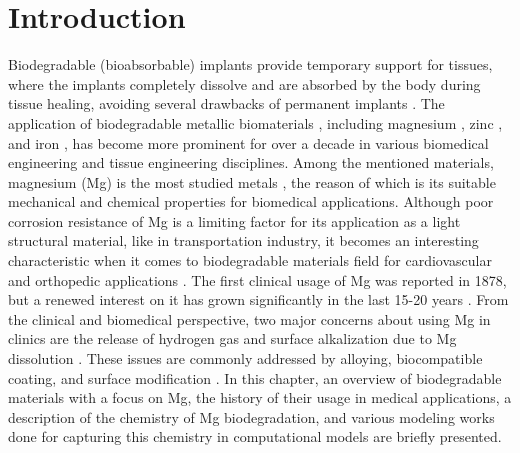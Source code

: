 \chapter{Introduction}\label{ch:introduction}


Biodegradable (bioabsorbable) implants provide temporary support for tissues, where the implants completely dissolve and are absorbed by the body during tissue healing, avoiding several drawbacks of permanent implants \cite{Gao2022}. The application of biodegradable metallic biomaterials \cite{Zheng2014, Liu2019, Han2019}, including magnesium \cite{Zhao2017,Zhen2013,Willumeit-Roemer2019}, zinc \cite{Venezuela2019,Mostaed2018}, and iron \cite{Schinhammer2010}, has become more prominent for over a decade in various biomedical engineering and tissue engineering disciplines. Among the mentioned materials, magnesium (Mg) is the most studied metals \cite{Esmaily2017}, the reason of which is its suitable mechanical and chemical properties for biomedical applications. Although poor corrosion resistance of Mg is a limiting factor for its application as a light structural material, like in transportation industry, it becomes an interesting characteristic when it comes to biodegradable materials field for cardiovascular and orthopedic applications \cite{Heublein2003,Staiger2006,Walker2014}. The first clinical usage of Mg was reported in 1878, but a renewed interest on it has grown significantly in the last 15-20 years \cite{Esmaily2017}. From the clinical and biomedical perspective, two major concerns about using Mg in clinics are the release of hydrogen gas and surface alkalization due to Mg dissolution \cite{Cecchinato2015}. These issues are commonly addressed by alloying, biocompatible coating, and surface modification \cite{Esmaily2017}. In this chapter, an overview of biodegradable materials with a focus on Mg, the history of their usage in medical applications, a description of the chemistry of Mg biodegradation, and various modeling works done for capturing this chemistry in computational models are briefly presented.

